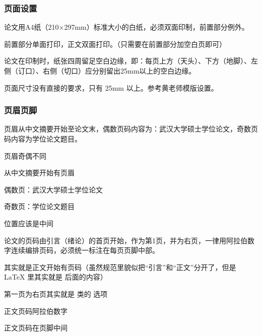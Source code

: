 \subsubsection{页面设置}

\begin{reference}
  论文用A4纸（210×297mm）标准大小的白纸，必须双面印制，前置部分例外。
\end{reference}

\begin{points}
  \item 前置部分单面打印，正文双面打印。（只需要在前置部分加空白页即可）
\end{points}

\begin{reference}
  论文在印制时，纸张四周留足空白边缘，即：每页上方（天头）、下方（地脚）、左侧（订口）、右侧（切口）应分别留出25mm以上的空白边缘。
\end{reference}

\begin{points}
  \item 页面尺寸没有直接的要求，只有 25mm 以上。参考黄老师模版设置。
\end{points}


\subsubsection{页眉页脚}

\begin{reference}
  页眉从中文摘要开始至论文末，偶数页码内容为：武汉大学硕士学位论文，奇数页码内容为学位论文题目。
\end{reference}

\begin{points}
  \item 页眉奇偶不同
  \item 从中文摘要开始有页眉
  \item 偶数页：武汉大学硕士学位论文
  \item 奇数页：学位论文题目
  \item 位置应该是中间
\end{points}

\begin{reference}
  论文的页码由引言（绪论）的首页开始，作为第1页，并为右页，一律用阿拉伯数字连续编排页码，必须统一标注在每页页脚中部。
\end{reference}

\begin{points}
  \item 其实就是正文开始有页码（虽然规范里貌似把“引言”和“正文”分开了，但是 \LaTeX{} 里其实就是  后面的内容）
  \item 第一页为右页其实就是  类的  选项
  \item 正文页码阿拉伯数字
  \item 正文页码在页脚中间
\end{points}


